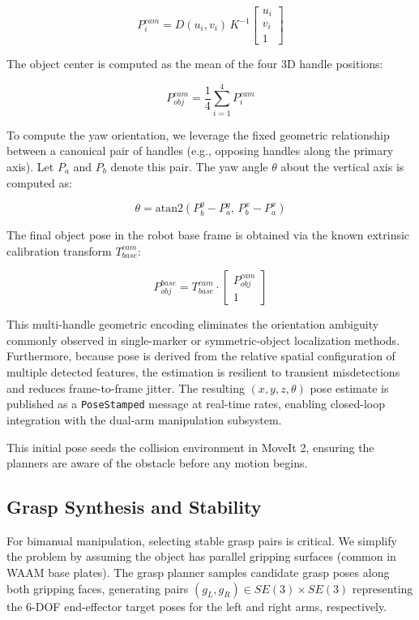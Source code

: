 \documentclass[letterpaper, 10 pt, conference]{ieeeconf}  %
\begin{document}
\begin{equation}
P_i^{cam} = D(u_i, v_i) \, K^{-1}
\begin{bmatrix}
u_i \\
v_i \\
1
\end{bmatrix}
\end{equation}

The object center is computed as the mean of the four 3D handle
positions:

\begin{equation}
P_{obj}^{cam} = \frac{1}{4} \sum_{i=1}^{4} P_i^{cam}
\end{equation}

To compute the yaw orientation, we leverage the fixed geometric
relationship between a canonical pair of handles (e.g., opposing handles
along the primary axis). Let $P_a$ and $P_b$ denote this pair. The yaw
angle $\theta$ about the vertical axis is computed as:

\begin{equation}
\theta = \text{atan2}(P_b^y - P_a^y,\, P_b^x - P_a^x)
\end{equation}

The final object pose in the robot base frame is obtained via the
known extrinsic calibration transform $T_{base}^{cam}$:

\begin{equation}
P_{obj}^{base} = T_{base}^{cam} \cdot
\begin{bmatrix}
P_{obj}^{cam} \\
1
\end{bmatrix}
\end{equation}

This multi-handle geometric encoding eliminates the orientation
ambiguity commonly observed in single-marker or symmetric-object
localization methods. Furthermore, because pose is derived from the
relative spatial configuration of multiple detected features, the
estimation is resilient to transient misdetections and reduces
frame-to-frame jitter. The resulting $(x, y, z, \theta)$ pose estimate
is published as a \texttt{PoseStamped} message at real-time rates,
enabling closed-loop integration with the dual-arm manipulation
subsystem.


This initial pose seeds the collision environment in MoveIt 2, ensuring the planners are aware of the obstacle before any motion begins.

\subsection{Grasp Synthesis and Stability}
For bimanual manipulation, selecting stable grasp pairs is critical. We simplify the problem by assuming the object has parallel gripping surfaces (common in WAAM base plates). The grasp planner samples candidate grasp poses along both gripping faces, generating pairs $(g_L, g_R) \in SE(3) \times SE(3)$ representing the 6-DOF end-effector target poses for the left and right arms, respectively.
\end{document}
